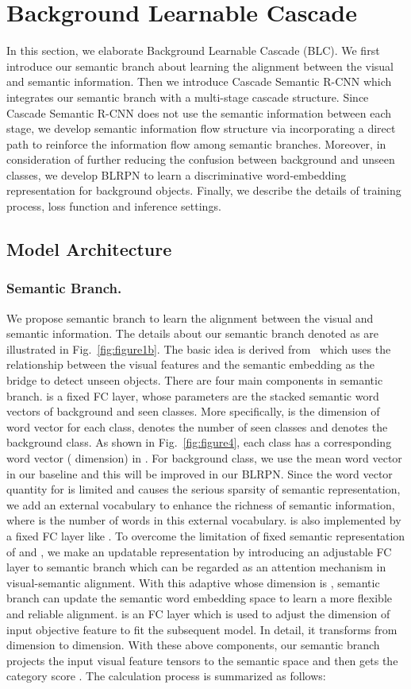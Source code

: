 \documentclass[runningheads]{llncs}
\begin{document}
\section{Background Learnable Cascade}
In this section, we elaborate Background Learnable Cascade (BLC). We first introduce our semantic branch about learning the alignment between the visual and semantic information. Then we introduce Cascade Semantic R-CNN which integrates our semantic branch with a multi-stage cascade structure. Since Cascade Semantic R-CNN does not use the semantic information between each stage, we develop semantic information flow structure via incorporating a direct path to reinforce the information flow among semantic branches. Moreover, in consideration of further reducing the confusion between background and unseen classes, we develop BLRPN to learn a discriminative word-embedding representation for background objects. Finally, we describe the details of training process, loss function and inference settings.
\subsection{Model Architecture}
\subsubsection{Semantic Branch.\label{Semantic Branch}}
We propose semantic branch to learn the alignment between the visual and semantic information. The details about our semantic branch denoted as  are illustrated in Fig.~\ref{fig:figure1b}. The basic idea is derived from~\cite{rahman2020improved} which uses the relationship between the visual features and the semantic embedding as the bridge to detect unseen objects. There are four main components in semantic branch.  is a fixed FC layer, whose parameters are the stacked semantic word vectors of background and seen classes. More specifically,  is the dimension of word vector for each class,  denotes the number of seen classes and  denotes the background class. As shown in Fig.~\ref{fig:figure4}, each class has a corresponding word vector  ( dimension) in . For background class, we use the mean word vector  in our baseline and this  will be improved in our BLRPN. Since the word vector quantity for  is limited and causes the serious sparsity of semantic representation, we add an external vocabulary  to enhance the richness of semantic information, where  is the number of words in this external vocabulary.  is also implemented by a fixed FC layer like . To overcome the limitation of fixed semantic representation of  and , we make an updatable representation by introducing an adjustable FC layer  to semantic branch which can be regarded as an attention mechanism in visual-semantic alignment. With this adaptive  whose dimension is , semantic branch can update the semantic word embedding space to learn a more flexible and reliable alignment.  is an FC layer which is used to adjust the dimension of input objective feature  to fit the subsequent model. In detail, it transforms  from  dimension to  dimension. With these above components, our semantic branch projects the input visual feature tensors to the semantic space and then gets the category score . The calculation process is summarized as follows: 
\end{document}
